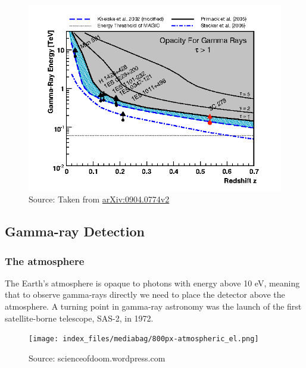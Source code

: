 \documentclass[
  letterpaper,
  DIV=11,
  numbers=noendperiod]{scrreprt}
\begin{document}
\begin{figure}[H]

{\centering \includegraphics{images/ELB.png}

}

\caption{Source: Taken from
\href{http://arxiv.org/abs/0904.0774}{arXiv:0904.0774v2}}

\end{figure}%

\subsection{Gamma-ray Detection}\label{gamma-ray-detection}

\subsubsection{The atmosphere}\label{the-atmosphere-1}

The Earth's atmosphere is opaque to photons with energy above 10 eV,
meaning that to observe gamma-rays directly we need to place the
detector above the atmosphere. A turning point in gamma-ray astronomy
was the launch of the first satellite-borne telescope, SAS-2, in 1972.

\begin{figure}[H]

{\centering \texttt{[image: index\_files/mediabag/800px-atmospheric\_el.png]}

}

\caption{Source: scienceofdoom.wordpress.com}

\end{figure}%
\end{document}
